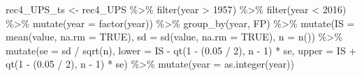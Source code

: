 \documentclass[
]{article}
\newenvironment{Shaded}{\begin{snugshade}}{\end{snugshade}}
\newcommand{\AttributeTok}[1]{\textcolor[rgb]{0.77,0.63,0.00}{#1}}
\newcommand{\ConstantTok}[1]{\textcolor[rgb]{0.00,0.00,0.00}{#1}}
\newcommand{\DecValTok}[1]{\textcolor[rgb]{0.00,0.00,0.81}{#1}}
\newcommand{\FloatTok}[1]{\textcolor[rgb]{0.00,0.00,0.81}{#1}}
\newcommand{\FunctionTok}[1]{\textcolor[rgb]{0.00,0.00,0.00}{#1}}
\newcommand{\NormalTok}[1]{#1}
\newcommand{\OtherTok}[1]{\textcolor[rgb]{0.56,0.35,0.01}{#1}}
\newcommand{\SpecialCharTok}[1]{\textcolor[rgb]{0.00,0.00,0.00}{#1}}
\begin{document}
\begin{Shaded}
\begin{Highlighting}[]
\NormalTok{rec4\_UPS\_ts }\OtherTok{\textless{}{-}}\NormalTok{ rec4\_UPS }\SpecialCharTok{\%\textgreater{}\%} 
  \FunctionTok{filter}\NormalTok{(year }\SpecialCharTok{\textgreater{}} \DecValTok{1957}\NormalTok{) }\SpecialCharTok{\%\textgreater{}\%}
  \FunctionTok{filter}\NormalTok{(year }\SpecialCharTok{\textless{}} \DecValTok{2016}\NormalTok{) }\SpecialCharTok{\%\textgreater{}\%} 
  \FunctionTok{mutate}\NormalTok{(}\AttributeTok{year =} \FunctionTok{factor}\NormalTok{(year)) }\SpecialCharTok{\%\textgreater{}\%} 
  \FunctionTok{group\_by}\NormalTok{(year, FP) }\SpecialCharTok{\%\textgreater{}\%} 
  \FunctionTok{mutate}\NormalTok{(}\AttributeTok{IS =} \FunctionTok{mean}\NormalTok{(value, }\AttributeTok{na.rm =} \ConstantTok{TRUE}\NormalTok{), }
            \AttributeTok{sd =} \FunctionTok{sd}\NormalTok{(value, }\AttributeTok{na.rm =} \ConstantTok{TRUE}\NormalTok{),}
            \AttributeTok{n =} \FunctionTok{n}\NormalTok{()) }\SpecialCharTok{\%\textgreater{}\%} 
  \FunctionTok{mutate}\NormalTok{(}\AttributeTok{se =}\NormalTok{ sd }\SpecialCharTok{/} \FunctionTok{sqrt}\NormalTok{(n),}
         \AttributeTok{lower =}\NormalTok{ IS }\SpecialCharTok{{-}} \FunctionTok{qt}\NormalTok{(}\DecValTok{1} \SpecialCharTok{{-}}\NormalTok{ (}\FloatTok{0.05} \SpecialCharTok{/} \DecValTok{2}\NormalTok{), n }\SpecialCharTok{{-}} \DecValTok{1}\NormalTok{) }\SpecialCharTok{*}\NormalTok{ se,}
         \AttributeTok{upper =}\NormalTok{ IS }\SpecialCharTok{+} \FunctionTok{qt}\NormalTok{(}\DecValTok{1} \SpecialCharTok{{-}}\NormalTok{ (}\FloatTok{0.05} \SpecialCharTok{/} \DecValTok{2}\NormalTok{), n }\SpecialCharTok{{-}} \DecValTok{1}\NormalTok{) }\SpecialCharTok{*}\NormalTok{ se) }\SpecialCharTok{\%\textgreater{}\%} 
  \FunctionTok{mutate}\NormalTok{(}\AttributeTok{year =} \FunctionTok{as.integer}\NormalTok{(year))}
  

\end{Highlighting}
\end{Shaded}
\end{document}
